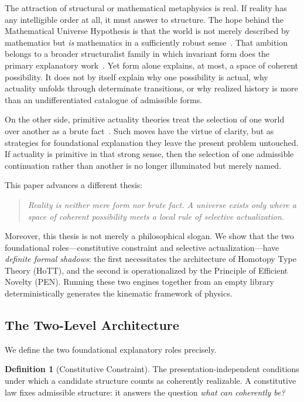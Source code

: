 \documentclass[11pt,a4paper]{article}
\theoremstyle{plain}
\theoremstyle{definition}
\newtheorem{definition}[theorem]{Definition}
\theoremstyle{remark}
\begin{document}
The attraction of structural or mathematical metaphysics is real.  If reality has any intelligible order at all, it must answer to structure.  The hope behind the Mathematical Universe Hypothesis is that the world is not merely described by mathematics but \emph{is} mathematics in a sufficiently robust sense~\cite{tegmark2008}.  That ambition belongs to a broader structuralist family in which invariant form does the primary explanatory work~\cite{worrall1989,ladyman1998,shapiro1997,french2014,ladyman2007}.  Yet form alone explains, at most, a space of coherent possibility.  It does not by itself explain why one possibility is actual, why actuality unfolds through determinate transitions, or why realized history is more than an undifferentiated catalogue of admissible forms.

On the other side, primitive actuality theories treat the selection of one world over another as a brute fact~\cite{lewis1986,plantinga1974}.  Such moves have the virtue of clarity, but as strategies for foundational explanation they leave the present problem untouched.  If actuality is primitive in that strong sense, then the selection of one admissible continuation rather than another is no longer illuminated but merely named.

This paper advances a different thesis:
\begin{quote}
\emph{Reality is neither mere form nor brute fact.  A universe exists only where a space of coherent possibility meets a local rule of selective actualization.}
\end{quote}

Moreover, this thesis is not merely a philosophical slogan.  We show that the two foundational roles---constitutive constraint and selective actualization---have \emph{definite formal shadows}: the first necessitates the architecture of Homotopy Type Theory (HoTT), and the second is operationalized by the Principle of Efficient Novelty (PEN).  Running these two engines together from an empty library deterministically generates the kinematic framework of physics.


\subsection{The Two-Level Architecture}
\label{sec:two-level}

We define the two foundational explanatory roles precisely.

\begin{definition}[Constitutive Constraint]
\label{def:constitutive}
The presentation-independent conditions under which a candidate structure counts as coherently realizable.  A constitutive law fixes admissible structure: it answers the question \emph{what can coherently be?}
\end{definition}
\end{document}
